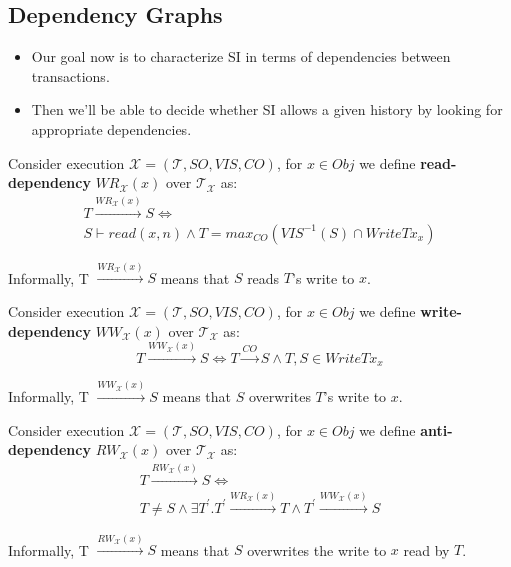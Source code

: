\documentclass{beamer}
\begin{document}
\subsection{Dependency Graphs}

\begin{frame}
	\begin{itemize}
		\item Our goal now is to characterize SI in terms of dependencies between transactions.
		\item Then we'll be able to decide whether SI allows a given history by looking for appropriate dependencies.
	\end{itemize}
\end{frame}

\begin{frame}
	\begin{definition}
		Consider execution $\mathcal{X} = (\mathcal{T}, SO, VIS, CO)$, for $x \in Obj$ we define \textbf{read-dependency} $WR_\mathcal{X}(x)$ over $\mathcal{T}_\mathcal{X}$ as:
		\begin{multline*}
			T \xrightarrow{WR_\mathcal{X}(x)} S \Leftrightarrow \\
			S \vdash read(x,n) \wedge T = max_{CO}\left( VIS^{-1}(S) \cap WriteTx_x \right)
		\end{multline*}
	\end{definition}
	Informally, T $ \xrightarrow{WR_\mathcal{X}(x)} S $ means that $S$ reads $T$'s write to $x$.
\end{frame}

\begin{frame}
	\begin{definition}
		Consider execution $\mathcal{X} = (\mathcal{T}, SO, VIS, CO)$, for $x \in Obj$ we define \textbf{write-dependency} $WW_\mathcal{X}(x)$ over $\mathcal{T}_\mathcal{X}$ as:
		$$
			T \xrightarrow{WW_\mathcal{X}(x)} S \Leftrightarrow T \xrightarrow{CO}S \wedge T,S \in WriteTx_x
		$$
	\end{definition}
	Informally, T $ \xrightarrow{WW_\mathcal{X}(x)} S $ means that $S$ overwrites $T$'s write to $x$.
\end{frame}


\begin{frame}
	\begin{definition}
		Consider execution $\mathcal{X} = (\mathcal{T}, SO, VIS, CO)$, for $x \in Obj$ we define \textbf{anti-dependency} $RW_\mathcal{X}(x)$ over $\mathcal{T}_\mathcal{X}$ as:
		\begin{multline*}
			T \xrightarrow{RW_\mathcal{X}(x)} S \Leftrightarrow \\
			T \ne S \wedge \exists T^\prime . T^\prime \xrightarrow{WR_\mathcal{X}(x)}T \wedge T^\prime \xrightarrow{WW_\mathcal{X}(x)}S
		\end{multline*}
	\end{definition}
	Informally, T $ \xrightarrow{RW_\mathcal{X}(x)} S $ means that $S$ overwrites the write to $x$ read by $T$.
\end{frame}
\end{document}
